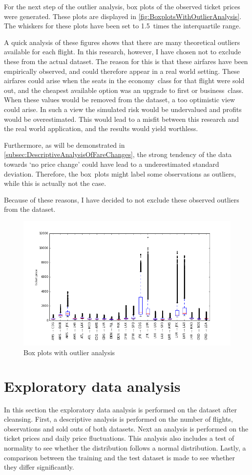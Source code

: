For the next step of the outlier analysis, box plots of the observed ticket prices were generated. These plots are displayed in \autoref{fig:BoxplotsWithOutlierAnalysis}. The whiskers for these plots have been set to 1.5~times the interquartile range.

A quick analysis of these figures shows that there are many theoretical outliers available for each flight. In this research, however, I have chosen not to exclude these from the actual dataset. The reason for this is that these airfares have been empirically observed, and could therefore appear in a real world setting. These airfares could arise when the seats in the economy~class for that flight were sold out, and the cheapest available option was an upgrade to first or business~class. When these values would be removed from the dataset, a too optimistic view could arise. In such a view the simulated risk would be undervalued and profits would be overestimated. This would lead to a misfit between this research and the real world application, and the results would yield worthless.

Furthermore, as will be demonstrated in \autoref{subsec:DescriptiveAnalysisOfFareChanges}, the strong tendency of the data towards `no price change' could have lead to a underestimated standard deviation. Therefore, the box~plots might label some observations as outliers, while this is actually not the case.

Because of these reasons, I have decided to not exclude these observed outliers from the dataset.


\begin{figure}
\centering
\includegraphics[width=.8\textwidth]{figures/outlierAnalysis}
\caption{Box plots with outlier analysis}
\label{fig:BoxplotsWithOutlierAnalysis}
\end{figure}


\section{Exploratory data analysis}
In this section the exploratory data analysis is performed on the dataset after cleansing. First, a descriptive analysis is performed on the number of flights, observations and sold outs of both datasets. Next an analysis is performed on the ticket prices and daily price fluctuations. This analysis also includes a test of normality to see whether the distribution follows a normal distribution. Lastly, a comparison between the training and the test dataset is made to see whether they differ significantly.

